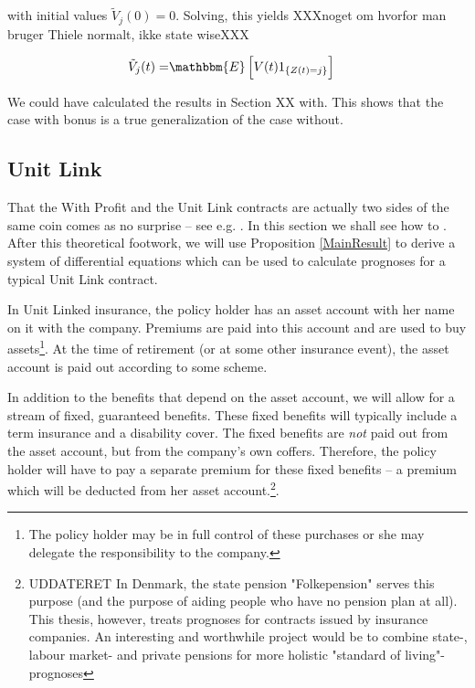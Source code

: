 \documentclass{book}
\newcommand{\1}[1]{\mathbbm{1}_{\left\lbrace #1 \right\rbrace}}
\newcommand{\expec}[1][def]{\mathbbm{E} \left[ #1 \right]}
\theoremstyle{break}
\theoremstyle{remark}
\newenvironment{remark}
  {\pushQED{\qed}\renewcommand{\qedsymbol}{\scalebox{1.4}{$\circ$}}\remarkx}
  {\popQED\endremarkx}
\numberwithin{equation}{section}
\begin{document}
\begin{remark}
	with initial values $\tilde{V}_j(0)=0$. Solving, this yields XXXnoget om hvorfor man bruger Thiele normalt, ikke state wiseXXX
	
	\begin{align*}
	\tilde{V}_j(t) =& \expec[ V(t) 1_{\{Z(t)=j\}} ]
	\end{align*}
	
	
	
	We could have calculated the results in Section XX with. This shows that the case with bonus is a true generalization of the case without.
\end{remark}

\subsection{Unit Link}

That the With Profit and the Unit Link contracts are actually two sides of the same coin comes as no surprise -- see e.g. \cite{Liv2 cph VI}. In this section we shall see how to . After this theoretical footwork, we will use Proposition \ref{MainResult} to derive a system of differential equations which can be used to calculate prognoses for a typical Unit Link contract.

In Unit Linked insurance, the policy holder has an asset account with her name on it with the company. Premiums are paid into this account and are used to buy assets\footnote{The policy holder may be in full control of these purchases or she may delegate the responsibility to the company.}. At the time of retirement (or at some other insurance event), the asset account is paid out according to some scheme.

In addition to the benefits that depend on the asset account, we will allow for a stream of fixed, guaranteed benefits. These fixed benefits will typically include a term insurance and a disability cover. The fixed benefits are \textit{not} paid out from the asset account, but from the company's own coffers. Therefore, the policy holder will have to pay a separate premium for these fixed benefits -- a premium which will be deducted from her asset account.\footnote{UDDATERET In Denmark, the state pension "Folkepension" serves this purpose (and the purpose of aiding people who have no pension plan at all). This thesis, however, treats prognoses for contracts issued by insurance companies. An interesting and worthwhile project would be to combine state-, labour market- and private pensions for more holistic "standard of living"-prognoses}.
\end{document}
